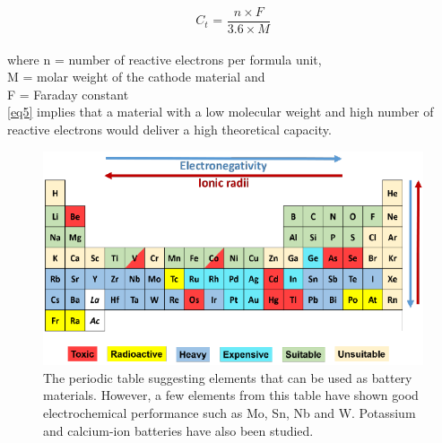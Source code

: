 \begin{equation} \label{eq5}
   C_{t} \text{ = } \frac{n \times F}{3.6 \times M}
\end{equation}\\
where n = number of reactive electrons per formula unit,\\
M = molar weight of the cathode material and\\
F = Faraday constant\\
\ref{eq5} implies that a material with a low molecular weight and high number of reactive electrons would deliver a high theoretical capacity.

\begin{figure}[h!]
\centering
\includegraphics[width=\textwidth]{Figures/chap1fig/pertab}
\caption{The periodic table suggesting elements that can be used as battery materials. However, a few elements from this table have shown good electrochemical performance such as Mo, Sn, Nb and W. Potassium and calcium-ion batteries have also been studied.}
\label{Figures/chap1fig:pertab}
\end{figure}\\

